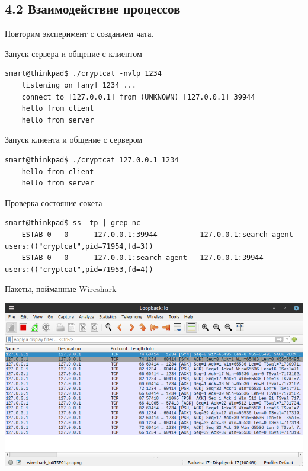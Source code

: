 \subsection*{4.2 Взаимодействие процессов}

Повторим эксперимент с созданием чата.

Запуск сервера и общение с клиентом
\begin{Verbatim}[frame=single]
    smart@thinkpad$ ./cryptcat -nvlp 1234
    listening on [any] 1234 ...
    connect to [127.0.0.1] from (UNKNOWN) [127.0.0.1] 39944
    hello from client
    hello from server
\end{Verbatim}

Запуск клиента и общение с сервером
\begin{Verbatim}[frame=single]
    smart@thinkpad$ ./cryptcat 127.0.0.1 1234
    hello from client
    hello from server
\end{Verbatim}

Проверка состояние сокета
\begin{Verbatim}[frame=single]
    smart@thinkpad$ ss -tp | grep nc
    ESTAB 0   0      127.0.0.1:39944          127.0.0.1:search-agent users:(("cryptcat",pid=71954,fd=3))
    ESTAB 0   0      127.0.0.1:search-agent   127.0.0.1:39944        users:(("cryptcat",pid=71953,fd=4))
\end{Verbatim}

Пакеты, пойманные Wireshark
\begin{center}
    \includegraphics[scale=0.55]{res/7.wireshark-cryptcat-chat.png}
\end{center}

